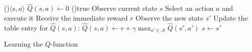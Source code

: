 \begin{algorithm}[H]
	\footnotesize
	\DontPrintSemicolon
 	\ForEach(){$\langle s, a \rangle$}{
 		$\widehat{Q}(s, a) \longleftarrow 0$ \;
 	}
	\While(){true}{
  		Observe current state $s$\;
  		Select an action $a$ and execute it\;
  		Receive the immediate reward $r$\;
  		Observe the new state $s'$\;
  		Update the table entry for $\widehat{Q}(s, a)$:
  			$\widehat{Q}(s, a) \longleftarrow r + \gamma \max_{a' \in \mathcal{A}} \widehat{Q}(s', a')$\;
  		$s \longleftarrow s'$\;
 	}
 	
 	\caption{Learning the $Q$-function}
\end{algorithm}